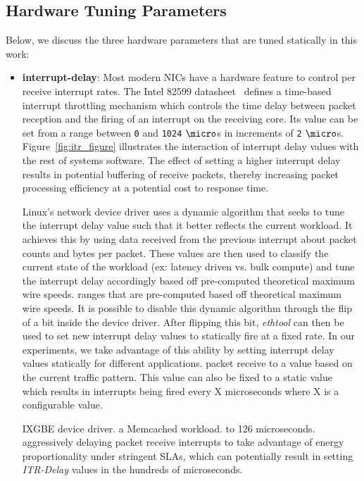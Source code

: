 \subsection{Hardware Tuning Parameters}
Below, we discuss the three hardware parameters that are tuned statically in
this work:
\label{sec:knobs}
\begin{itemize}
\item \textbf{interrupt-delay}: Most modern NICs have a hardware feature to
control per receive interrupt rates.
The Intel 82599 datasheet~\cite{82599} defines a time-based interrupt
throttling mechanism which controls the time delay between packet reception and
the firing of an interrupt on the receiving core.
Its value can be set from a range between \texttt{0} and \texttt{1024}
$\micro$s in increments of \texttt{2} $\micro$s.
Figure~\ref{fig:itr_figure} illustrates the interaction of interrupt delay
values with the rest of systems software.
The effect of setting a higher interrupt delay results in potential buffering
of receive packets, thereby increasing packet processing efficiency at a
potential cost to response time.

Linux's network device driver uses a dynamic algorithm that seeks to tune the
interrupt delay value such that it better reflects the current workload.
It achieves this by using data received from the previous interrupt about
packet counts and bytes per packet.
These values are then used to classify the current state of the workload (ex:
latency driven vs. bulk compute) and tune the interrupt delay accordingly based
off pre-computed theoretical maximum wire speeds.
ranges that are pre-computed based off theoretical maximum wire speeds.
It is possible to disable this dynamic algorithm through the flip of a bit
inside the device driver. After flipping this bit, \textit{ethtool} can then be
used to set new interrupt delay values to statically fire at a fixed rate.
In our experiments, we take advantage of this ability by setting interrupt
delay values statically for different applications.
packet receive to a value based on the current traffic pattern. This value can
also be fixed to a static value which results in interrupts being fired every X
microseconds where X is a configurable value.


IXGBE device driver.
a Memcached workload.
to 126 microseconds.
aggressively delaying packet receive interrupts to take advantage of energy
proportionality under stringent SLAs, which can potentially result in setting
\textit{ITR-Delay} values in the hundreds of microseconds.


\end{itemize}
